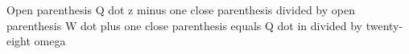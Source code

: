 Open parenthesis Q dot z minus one close parenthesis divided by open parenthesis W dot plus one close parenthesis equals Q dot in divided by twenty-eight omega
